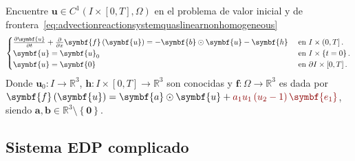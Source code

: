 Encuentre
\begin{math}
	\symbf{u}\in
	C^{1}\left(I\times\left[0,T\right],\Omega\right)
\end{math}
en el problema de valor inicial y de frontera~\eqref{eq:advectionreactionsystemquaslinearnonhomogeneous}
\begin{equation}\label{eq:advectionreactionsystemquaslinearnonhomogeneous}
	\begin{cases}
		\diffp{\symbf{u}}{t}+\diffp{}{x}\symbf{f}\left(\symbf{u}\right)=
		-\symbf{b}\odot\symbf{u}-\symbf{h} & \text{ en }I\times\left(0,T\right].          \\
		\symbf{u}                                                      =
		\symbf{u}_{0}                      & \text{ en }I\times\left\{t=0\right\}.        \\
		\symbf{u}                                                       =
		\symbf{0}                          & \text{ en }\partial I\times\left[0,T\right].
	\end{cases}
\end{equation}
Donde
\begin{math}
	\symbf{u}_{0}\colon I\to
	\mathbb{R}^{3}
\end{math},
\begin{math}
	\symbf{h}\colon I\times\left[0,T\right]\to
	\mathbb{R}^{3}
\end{math}
son conocidas y
\begin{math}
	\symbf{f}\colon\Omega\to
	\mathbb{R}^{3}
\end{math}
es dada por
\begin{math}
	\symbf{f}\left(\symbf{u}\right)=
	\symbf{a}\odot\symbf{u}+
	\mathcolor{DarkRed}{a_{1}u_{1}\left(u_{2}-1\right)\symbf{e_{1}}}
\end{math},
siendo $\symbf{a},\symbf{b}\in\mathbb{R}^{3}\setminus\left\{\symbf{0}\right\}$.

\subsection*{\color{DarkRed}Sistema EDP complicado}

